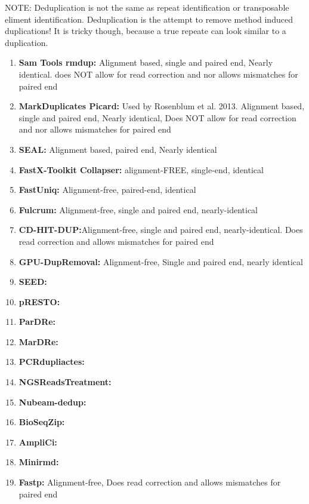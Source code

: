 \documentclass{article}
\begin{document}
    NOTE: Deduplication is not the same as repeat identification or transposable eliment identification.   Deduplication is the attempt to remove method induced duplications!  It is tricky though, because a true repeate can look similar to a duplication.
    \begin{enumerate}
        \item \textbf{Sam Tools rmdup:} Alignment based, single and paired end, Nearly identical.     does NOT allow for read correction and nor allows mismatches for paired end 
        \item \textbf{MarkDuplicates Picard:} Used by Rosenblum et al. 2013.   Alignment based, single and paired end, Nearly identical,  Does NOT allow for read correction and nor allows mismatches for paired end 
        \item \textbf{SEAL:} Alignment based, paired end, Nearly identical
        \item \textbf{FastX-Toolkit Collapser:} alignment-FREE, single-end, identical
        \item \textbf{FastUniq:} Alignment-free, paired-end, identical
        \item \textbf{Fulcrum:} Alignment-free, single and paired end, nearly-identical
        \item \textbf{CD-HIT-DUP:}Alignment-free, single and paired end, nearly-identical.    Does read correction and allows mismatches for paired end 
        \item \textbf{GPU-DupRemoval:} Alignment-free, Single and paired end, nearly identical
        \item \textbf{SEED:}
        \item \textbf{pRESTO:}
        \item \textbf{ParDRe:}
        \item \textbf{MarDRe:}
        \item \textbf{PCRdupliactes:}
        \item \textbf{NGSReadsTreatment:}
        \item \textbf{Nubeam-dedup:}
        \item \textbf{BioSeqZip:}
        \item \textbf{AmpliCi:}
        \item \textbf{Minirmd:}
        \item \textbf{Fastp:} Alignment-free, Does read correction and allows mismatches for paired end 
    \end{enumerate}
\end{document}
